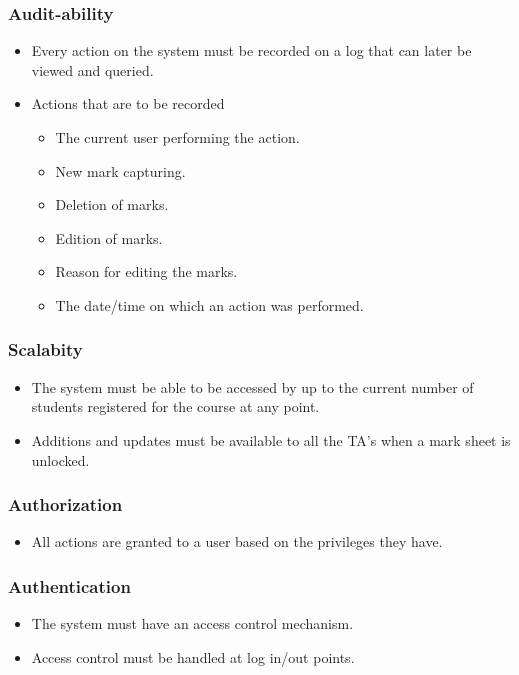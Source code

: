 \documentclass[11pt,a4paper]{article}
\begin{document}
	\subsubsection{Audit-ability}
	\begin{itemize}
		\item Every action on the system must be recorded on a log that can later be viewed and queried.
		\item Actions that are to be recorded
		\begin{itemize}
			\item The current user performing the action.
			\item New mark capturing.
			\item Deletion of marks.
			\item Edition of marks.
			\item Reason for editing the marks.
			\item The date/time on which an action was performed.
		\end{itemize}
	\end{itemize}

\subsubsection{Scalabity}
	\begin{itemize}
		\item The system must be able to be accessed by up to the current number of students registered for the course at any point.
		\item Additions and updates must be available to all the TA's when a mark sheet is unlocked.
	\end{itemize}	

	\subsubsection{Authorization}
	\begin{itemize}
		\item All actions are granted to a user based on the privileges they have.
	\end{itemize}

	\subsubsection{Authentication}
	\begin{itemize}
		\item The system must have an access control mechanism.
		\item Access control must be handled at log in/out points.
	\end{itemize}
\end{document}

